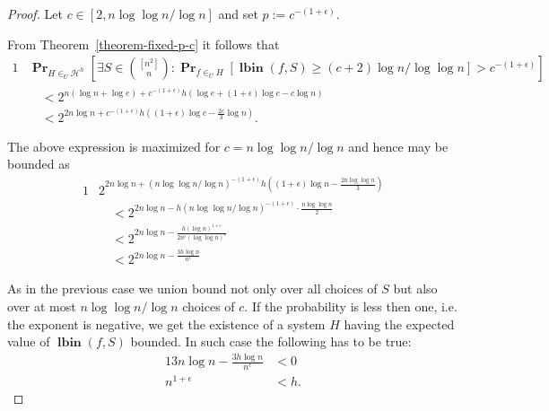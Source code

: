\documentclass{article}
\newcommand{\lbin}[2]{\operatorname{\mathbf{lbin}}({#1}, {#2})}
\newcommand{\probs}[2]{\operatorname{\mathbf{Pr}}_{{#1}}\left[{#2}\right]}
\begin{document}
\begin{proof}
Let $c \in [2, n \log \log n / \log n]$ and set $p := c^{-(1 + \epsilon)}$.

From Theorem~\ref{theorem-fixed-p-c} it follows that
\begin{alignat*}{1}
& \probs{H \in_U \mathcal{H}^h}{\exists S \in {[n^2] \choose n} \colon \probs{f \in_U H}{\lbin{f}{S} \geq (c + 2) \log n / \log \log n} > c^{-(1 + \epsilon)}} \\ 
& \quad < 2^{n(\log n + \log e) + c^{-(1 + \epsilon)}h(\log e + (1 + \epsilon)\log{c} - c \log n)} \\
& \quad < 2^{2n\log n + c^{-(1 + \epsilon)}h((1 + \epsilon)\log c - \frac{2c}{3} \log n)}.
\end{alignat*}

The above expression is maximized for $c = n \log \log n / \log n$ and hence may be bounded as
\begin{alignat*}{1}
& 2^{2n\log n + (n \log \log n / \log n)^{-(1 + \epsilon)}h((1 + \epsilon)\log n - \frac{2n \log \log n}{3})} \\ 
	& \quad < 2^{2n \log n - h(n\log \log n / \log n)^{-(1 + \epsilon)} \cdot \frac{n \log \log n}{2}} \\
	& \quad < 2^{2n \log n - \frac{h(\log n)^{1 + \epsilon}}{2n^\epsilon (\log \log n)^\epsilon}} \\
	& \quad < 2^{2n \log n - \frac{3h\log n}{n^\epsilon}}
\end{alignat*}

As in the previous case we union bound not only over all choices of $S$ but also over at most $n \log \log n / \log n$ choices of $c$. If the probability is less then one, i.e. the exponent is negative, we get the existence of a system $H$ having the expected value of $\lbin{f}{S}$ bounded. In such case the following has to be true:
\begin{alignat*}{1}
3n \log n - \frac{3h \log n}{n^\epsilon} & < 0 \\
n^{1 + \epsilon} & < h.
\end{alignat*}

\end{proof}
\end{document}
